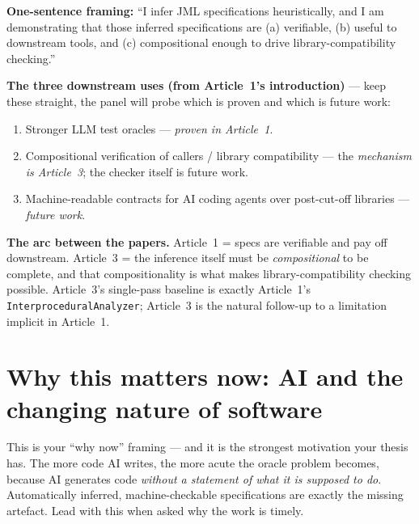 \documentclass[11pt]{article}
\begin{document}
\textbf{One-sentence framing:} ``I infer JML specifications heuristically, and
I am demonstrating that those inferred specifications are (a) verifiable,
(b) useful to downstream tools, and (c) compositional enough to drive
library-compatibility checking.''

\textbf{The three downstream uses (from Article~1's introduction)} --- keep
these straight, the panel will probe which is proven and which is future work:
\begin{enumerate}[leftmargin=1.6em,itemsep=0.1em]
  \item Stronger LLM test oracles --- \emph{proven in Article~1}.
  \item Compositional verification of callers / library compatibility --- the
        \emph{mechanism is Article~3}; the checker itself is future work.
  \item Machine-readable contracts for AI coding agents over post-cut-off
        libraries --- \emph{future work}.
\end{enumerate}

\textbf{The arc between the papers.} Article~1 = specs are verifiable and pay
off downstream. Article~3 = the inference itself must be \emph{compositional}
to be complete, and that compositionality is what makes library-compatibility
checking possible. Article~3's single-pass baseline is exactly Article~1's
\texttt{InterproceduralAnalyzer}; Article~3 is the natural follow-up to a
limitation implicit in Article~1.

\section{Why this matters now: AI and the changing nature of software}
\label{sec:aiswe}

This is your ``why now'' framing --- and it is the strongest motivation your
thesis has. The more code AI writes, the more acute the oracle problem becomes,
because AI generates code \emph{without a statement of what it is supposed to
do}. Automatically inferred, machine-checkable specifications are exactly the
missing artefact. Lead with this when asked why the work is timely.
\end{document}

